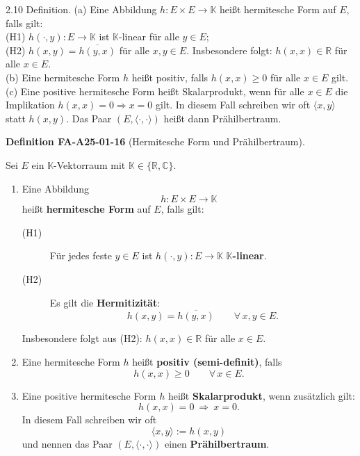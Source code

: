 \documentclass[10pt, letterpaper]{article}
\newcommand{\CustomHeading}[3]{%
  \par\medskip\noindent%
  \textbf{#1 #2} \textnormal{(#3)}.\enskip%
}
\newenvironment{DEF}[2]{\begin{unitbox}\CustomHeading{Definition}{#1}{#2}}{\end{unitbox}}
\begin{document}
2.10 Definition. (a) Eine Abbildung $h: E \times E \rightarrow \mathbb{K}$ heißt hermitesche Form auf $E$, falls gilt:\\
(H1) $h(\cdot, y): E \rightarrow \mathbb{K}$ ist $\mathbb{K}$-linear für alle $y \in E$;\\
(H2) $h(x, y)=\overline{h(y, x)}$ für alle $x, y \in E$. Insbesondere folgt: $h(x, x) \in \mathbb{R}$ für alle $x \in E$.\\
(b) Eine hermitesche Form $h$ heißt positiv, falls $h(x, x) \geq 0$ für alle $x \in E$ gilt.\\
(c) Eine positive hermitesche Form heißt Skalarprodukt, wenn für alle $x \in E$ die Implikation $h(x, x)=0 \Longrightarrow x=0$ gilt. In diesem Fall schreiben wir oft $\langle x, y\rangle$ statt $h(x, y)$. Das Paar $(E,\langle\cdot, \cdot\rangle)$ heißt dann Prähilbertraum.



\begin{DEF}{FA-A25-01-16}{Hermitesche Form und Prähilbertraum}
Sei $E$ ein $\mathbb{K}$-Vektorraum mit $\mathbb{K}\in\{\mathbb{R},\mathbb{C}\}$.

\begin{enumerate}[label=(\alph*)]

\item Eine Abbildung
\[
h: E\times E\to\mathbb{K}
\]
heißt \textbf{hermitesche Form} auf $E$, falls gilt:
\begin{description}
\item[(H1)] Für jedes feste $y\in E$ ist $h(\cdot,y):E\to\mathbb{K}$ \textbf{$\mathbb{K}$-linear}.
\item[(H2)] Es gilt die \textbf{Hermitizität}:
\[
h(x,y)=\overline{h(y,x)}\qquad\forall\,x,y\in E.
\]
\end{description}
Insbesondere folgt aus (H2): $h(x,x)\in\mathbb{R}$ für alle $x\in E$.

\item Eine hermitesche Form $h$ heißt \textbf{positiv (semi-definit)}, falls
\[
h(x,x)\ge 0\qquad\forall\,x\in E.
\]

\item Eine positive hermitesche Form $h$ heißt \textbf{Skalarprodukt}, wenn zusätzlich gilt:
\[
h(x,x)=0\ \Longrightarrow\ x=0.
\]
In diesem Fall schreiben wir oft
\[
\langle x,y\rangle := h(x,y)
\]
und nennen das Paar $(E,\langle\cdot,\cdot\rangle)$ einen \textbf{Prähilbertraum}.
\end{enumerate}
\end{DEF}
\end{document}
